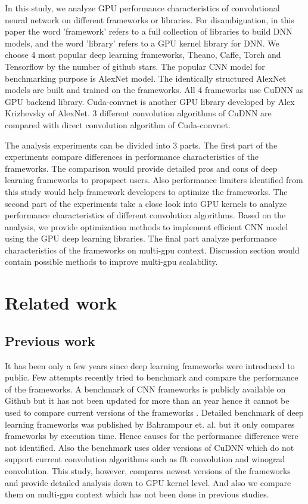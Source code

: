 \documentclass[conference]{IEEEtran}
\begin{document}
In this study, we analyze GPU performance characteristics of convolutional neural network on different frameworks or libraries.
For disambiguation, in this paper the word 'framework' refers to a full collection of libraries to build DNN models, and the word 'library' refers to a GPU kernel library for DNN.
We choose 4 most popular deep learning frameworks, Theano, Caffe, Torch and Tensorflow by the number of github stars.
The popular CNN model for benchmarking purpose is AlexNet model.
\cite{krizhevsky2012imagenet}
The identically structured AlexNet models are built and trained on the frameworks.
All 4 frameworks use CuDNN as GPU backend library.
Cuda-convnet is another GPU library developed by Alex Krizhevsky of AlexNet.
\cite{cuda-convnet}
3 different convolution algorithms of CuDNN are compared with direct convolution algorithm of Cuda-convnet.

The analysis experiments can be divided into 3 parts.
The first part of the experiments compare differences in performance characteristics of the frameworks.
The comparison would provide detailed pros and cons of deep learning frameworks to propspect users.
Also performance limiters identified from this study would help framework developers to optimize the frameworks.
The second part of the experiments take a close look into GPU kernels to analyze performance characteristics of different convolution algorithms.
Based on the analysis, we provide optimization methods to implement efficient CNN model using the GPU deep learning libraries.
The final part analyze performance characteristics of the frameworks on multi-gpu context.
Discussion section would contain possible methods to improve multi-gpu scalability.

\section{Related work}

\subsection{Previous work}
It has been only a few years since deep learning frameworks were introduced to public.
Few attempts recently tried to benchmark and compare the performance of the frameworks.
A benchmark of CNN frameworks is publicly available on Github but it has not been updated for more than an year hence it cannot be used to compare current versions of the frameworks \cite{}.
Detailed benchmark of deep learning frameworks was published by Bahrampour et. al. but it only compares frameworks by execution time.
Hence causes for the performance difference were not identified.
Also the benchmark uses older versions of CuDNN which do not support current convolution algorithms such as fft convolution and winograd convolution.
This study, however, compares newest versions of the frameworks and provide detailed analysis down to GPU kernel level.
And also we compare them on multi-gpu context which has not been done in previous studies.
\end{document}

